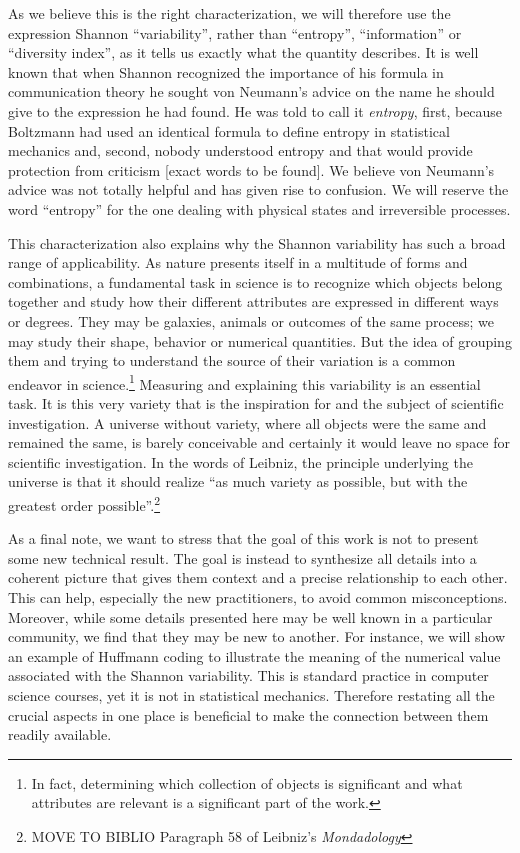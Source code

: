 \documentclass{article}
\begin{document}
As we believe this is the right characterization, we will therefore use the expression Shannon ``variability'', rather than ``entropy'', ``information'' or ``diversity index'', as it tells us exactly what the quantity describes. It is well known that when Shannon recognized the importance of his formula in communication theory he sought von Neumann's advice on the name he should give to the expression he had found. He was told to call it \emph{entropy}, first, because Boltzmann had used an identical formula to define entropy in statistical mechanics and, second, nobody understood entropy and that would provide protection from criticism [exact words to be found]. We believe von Neumann's advice was not totally helpful and has given rise to confusion. We will reserve the word ``entropy'' for the one dealing with physical states and irreversible processes.

This characterization also explains why the Shannon variability has such a broad range of applicability. As nature presents itself in a multitude of forms and combinations, a fundamental task in science is to recognize which objects belong together and study how their different attributes are expressed in different ways or degrees. They may be galaxies, animals or outcomes of the same process; we may study their shape, behavior or numerical quantities. But the idea of grouping them and trying to understand the source of their variation is a common endeavor in science.\footnote{In fact, determining which collection of objects is significant and what attributes are relevant is a significant part of the work.} Measuring and explaining this variability is an essential task. It is this very variety that is the inspiration for and the subject of scientific investigation. A universe without variety, where all objects were the same and remained the same, is barely conceivable and certainly it would leave no space for scientific investigation. In the words of Leibniz, the principle underlying the universe is that it should realize ``as much variety as possible, but with the greatest order possible''.\footnote{MOVE TO BIBLIO Paragraph 58 of Leibniz's \emph{Mondadology}} 

As a final note, we want to stress that the goal of this work is not to present some new technical result. The goal is instead to synthesize all details into a coherent picture that gives them context and a precise relationship to each other. This can help, especially the new practitioners, to avoid common misconceptions. Moreover, while some details presented here may be well known in a particular community, we find that they may be new to another. For instance, we will show an example of Huffmann coding to illustrate the meaning of the numerical value associated with the Shannon variability. This is standard practice in computer science courses, yet it is not in statistical mechanics. Therefore restating all the crucial aspects in one place is beneficial to make the connection between them readily available.
\end{document}
